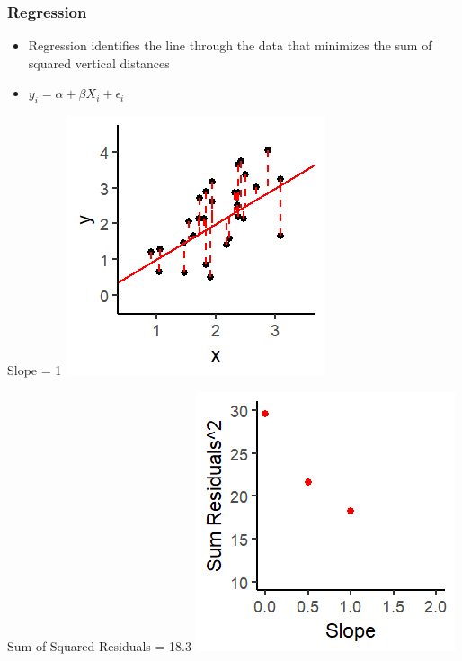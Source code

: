 \documentclass[xcolor=x11names,compress]{beamer}\usepackage[]{graphicx}\usepackage[]{color}
\makeatletter
\def\maxwidth{ %
  \ifdim\Gin@nat@width>\linewidth
    \linewidth
  \else
    \Gin@nat@width
  \fi
}
\newenvironment{knitrout}{}{} %
\renewcommand{\(}{\begin{columns}}
\renewcommand{\)}{\end{columns}}
\newcommand{\<}[1]{\begin{column}{#1}}
\renewcommand{\>}{\end{column}}
\makeatother
\begin{document}
\begin{frame}
\frametitle{Regression}
\begin{itemize}
\item Regression identifies the line through the data that minimizes the sum of squared vertical distances 
\item $y_i = \alpha + \beta X_i + \epsilon_i$
\end{itemize}
\begin{multicols}{2}
Slope = 1
\begin{knitrout}
\color{fgcolor}
\includegraphics[width=\maxwidth]{figure/graph_ols3-1} 

\end{knitrout}
\columnbreak
Sum of Squared Residuals = 18.3
\begin{knitrout}
\color{fgcolor}
\includegraphics[width=\maxwidth]{figure/graph_ssr3-1} 

\end{knitrout}
\end{multicols}
\end{frame}
\end{document}
